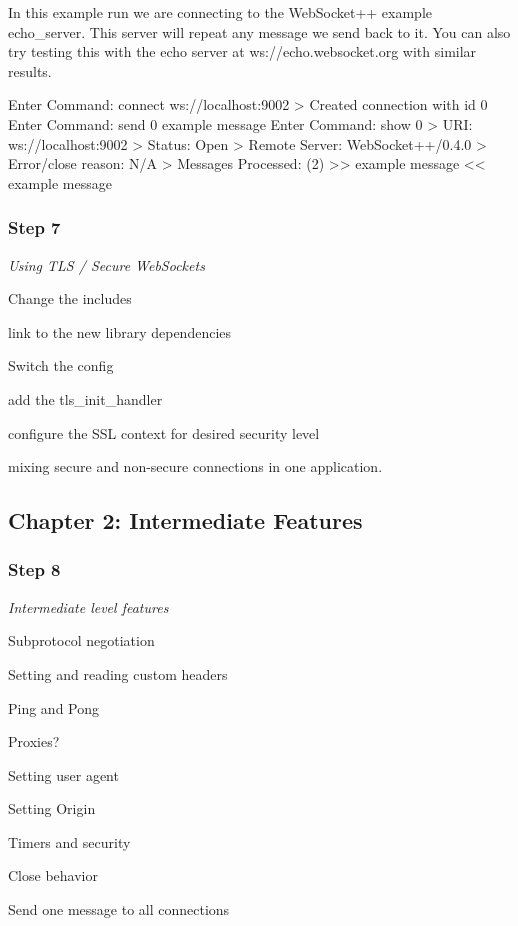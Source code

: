 In this example run we are connecting to the Web\+Socket++ example echo\+\_\+server. This server will repeat any message we send back to it. You can also try testing this with the echo server at {\ttfamily ws\+://echo.websocket.\+org} with similar results.


\begin{DoxyCode}
Enter Command: connect ws://localhost:9002
> Created connection with id 0
Enter Command: send 0 example message
Enter Command: show 0
> URI: ws://localhost:9002
> Status: Open
> Remote Server: WebSocket++/0.4.0
> Error/close reason: N/A
> Messages Processed: (2)
>>  example message
<<  example message
\end{DoxyCode}


\subsubsection*{Step 7}

{\itshape Using T\+LS / Secure Web\+Sockets}


\begin{DoxyItemize}
\item Change the includes
\item link to the new library dependencies
\item Switch the config
\item add the {\ttfamily tls\+\_\+init\+\_\+handler}
\item configure the S\+SL context for desired security level
\item mixing secure and non-\/secure connections in one application.
\end{DoxyItemize}

\subsection*{Chapter 2\+: Intermediate Features }

\subsubsection*{Step 8}

{\itshape Intermediate level features}


\begin{DoxyItemize}
\item Subprotocol negotiation
\item Setting and reading custom headers
\item Ping and Pong
\item Proxies?
\item Setting user agent
\item Setting Origin
\item Timers and security
\item Close behavior
\item Send one message to all connections
\end{DoxyItemize}

